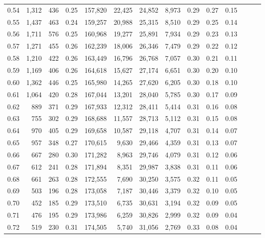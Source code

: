 \begin{tabular}{rrrrrrrrrrrrrr}
0.54 &  1,312 &  436 &  0.25 &  157,820 &   22,425 &  24,852 &   8,973 &  0.29 &  0.27 &      0.15 \\
0.55 &  1,437 &  463 &  0.24 &  159,257 &   20,988 &  25,315 &   8,510 &  0.29 &  0.25 &      0.14 \\
0.56 &  1,711 &  576 &  0.25 &  160,968 &   19,277 &  25,891 &   7,934 &  0.29 &  0.23 &      0.13 \\
0.57 &  1,271 &  455 &  0.26 &  162,239 &   18,006 &  26,346 &   7,479 &  0.29 &  0.22 &      0.12 \\
0.58 &  1,210 &  422 &  0.26 &  163,449 &   16,796 &  26,768 &   7,057 &  0.30 &  0.21 &      0.11 \\
0.59 &  1,169 &  406 &  0.26 &  164,618 &   15,627 &  27,174 &   6,651 &  0.30 &  0.20 &      0.10 \\
0.60 &  1,362 &  446 &  0.25 &  165,980 &   14,265 &  27,620 &   6,205 &  0.30 &  0.18 &      0.10 \\
0.61 &  1,064 &  420 &  0.28 &  167,044 &   13,201 &  28,040 &   5,785 &  0.30 &  0.17 &      0.09 \\
0.62 &    889 &  371 &  0.29 &  167,933 &   12,312 &  28,411 &   5,414 &  0.31 &  0.16 &      0.08 \\
0.63 &    755 &  302 &  0.29 &  168,688 &   11,557 &  28,713 &   5,112 &  0.31 &  0.15 &      0.08 \\
0.64 &    970 &  405 &  0.29 &  169,658 &   10,587 &  29,118 &   4,707 &  0.31 &  0.14 &      0.07 \\
0.65 &    957 &  348 &  0.27 &  170,615 &    9,630 &  29,466 &   4,359 &  0.31 &  0.13 &      0.07 \\
0.66 &    667 &  280 &  0.30 &  171,282 &    8,963 &  29,746 &   4,079 &  0.31 &  0.12 &      0.06 \\
0.67 &    612 &  241 &  0.28 &  171,894 &    8,351 &  29,987 &   3,838 &  0.31 &  0.11 &      0.06 \\
0.68 &    661 &  263 &  0.28 &  172,555 &    7,690 &  30,250 &   3,575 &  0.32 &  0.11 &      0.05 \\
0.69 &    503 &  196 &  0.28 &  173,058 &    7,187 &  30,446 &   3,379 &  0.32 &  0.10 &      0.05 \\
0.70 &    452 &  185 &  0.29 &  173,510 &    6,735 &  30,631 &   3,194 &  0.32 &  0.09 &      0.05 \\
0.71 &    476 &  195 &  0.29 &  173,986 &    6,259 &  30,826 &   2,999 &  0.32 &  0.09 &      0.04 \\
0.72 &    519 &  230 &  0.31 &  174,505 &    5,740 &  31,056 &   2,769 &  0.33 &  0.08 &      0.04 \\

\end{tabular}

